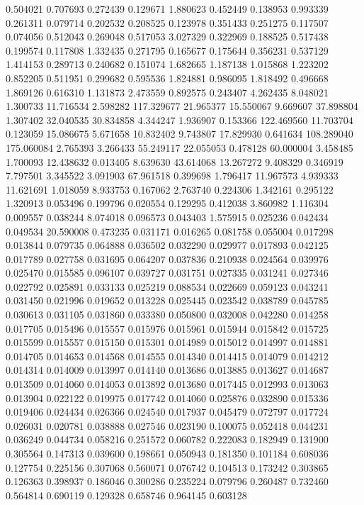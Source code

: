 0.504021
0.707693
0.272439
0.129671
1.880623
0.452449
0.138953
0.993339
0.261311
0.079714
0.202532
0.208525
0.123978
0.351433
0.251275
0.117507
0.074056
0.512043
0.269048
0.517053
3.027329
0.322969
0.188525
0.517438
0.199574
0.117808
1.332435
0.271795
0.165677
0.175644
0.356231
0.537129
1.414153
0.289713
0.240682
0.151074
1.682665
1.187138
1.015868
1.223202
0.852205
0.511951
0.299682
0.595536
1.824881
0.986095
1.818492
0.496668
1.869126
0.616310
1.131873
2.473559
0.892575
0.243407
4.262435
8.048021
1.300733
11.716534
2.598282
117.329677
21.965377
15.550067
9.669607
37.898804
1.307402
32.040535
30.834858
4.344247
1.936907
0.153366
122.469560
11.703704
0.123059
15.086675
5.671658
10.832402
9.743807
17.829930
0.641634
108.289040
175.060084
2.765393
3.266433
55.249117
22.055053
0.478128
60.000004
3.458485
1.700093
12.438632
0.013405
8.639630
43.614068
13.267272
9.408329
0.346919
7.797501
3.345522
3.091903
67.961518
0.399698
1.796417
11.967573
4.939333
11.621691
1.018059
8.933753
0.167062
2.763740
0.224306
1.342161
0.295122
1.320913
0.053496
0.199796
0.020554
0.129295
0.412038
3.860982
1.116304
0.009557
0.038244
8.074018
0.096573
0.043403
1.575915
0.025236
0.042434
0.049534
20.590008
0.473235
0.031171
0.016265
0.081758
0.055004
0.017298
0.013844
0.079735
0.064888
0.036502
0.032290
0.029977
0.017893
0.042125
0.017789
0.027758
0.031695
0.064207
0.037836
0.210938
0.024564
0.039976
0.025470
0.015585
0.096107
0.039727
0.031751
0.027335
0.031241
0.027346
0.022792
0.025891
0.033133
0.025219
0.088534
0.022669
0.059123
0.043241
0.031450
0.021996
0.019652
0.013228
0.025445
0.023542
0.038789
0.045785
0.030613
0.031105
0.031860
0.033380
0.050800
0.032008
0.042280
0.014258
0.017705
0.015496
0.015557
0.015976
0.015961
0.015944
0.015842
0.015725
0.015599
0.015557
0.015150
0.015301
0.014989
0.015012
0.014997
0.014881
0.014705
0.014653
0.014568
0.014555
0.014340
0.014415
0.014079
0.014212
0.014314
0.014009
0.013997
0.014140
0.013686
0.013885
0.013627
0.014687
0.013509
0.014060
0.014053
0.013892
0.013680
0.017445
0.012993
0.013063
0.013904
0.022122
0.019975
0.017742
0.014060
0.025876
0.032890
0.015336
0.019406
0.024434
0.026366
0.024540
0.017937
0.045479
0.072797
0.017724
0.026031
0.020781
0.038888
0.027546
0.023190
0.100075
0.052418
0.044231
0.036249
0.044734
0.058216
0.251572
0.060782
0.222083
0.182949
0.131900
0.305564
0.147313
0.039600
0.198661
0.050943
0.181350
0.101184
0.608036
0.127754
0.225156
0.307068
0.560071
0.076742
0.104513
0.173242
0.303865
0.126363
0.398937
0.186046
0.300286
0.235224
0.079796
0.260487
0.732460
0.564814
0.690119
0.129328
0.658746
0.964145
0.603128
